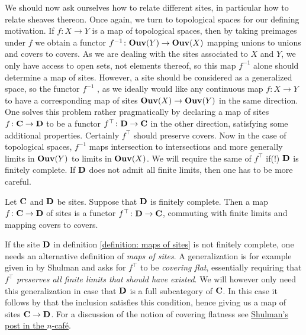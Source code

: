 We should now ask ourselves how to relate different sites, in particular how to relate sheaves thereon. Once again, we turn to topological spaces for our defining motivation. If $f\colon X \to Y$ is a map of topological spaces, then by taking preimages under $f$ we obtain a functor $f^{-1}\colon {{\mathbf{Ouv}}(Y)} \to {{\mathbf{Ouv}}(X)}$ mapping unions to unions and covers to covers. As we are dealing with the sites associated to $X$ and $Y$, we only have access to open sets, not elements thereof, so this map $f^{-1}$ alone should determine a map of sites. However, a site should be considered as a generalized space, so the functor $f^{-1}$ , as we ideally would like any continuous map $f\colon X\to Y$ to have a corresponding map of sites ${{\mathbf{Ouv}}(X)}\to {{\mathbf{Ouv}}(Y)}$ in the same direction. One solves this problem rather pragmatically by declaring a map of sites $f\colon {{\mathbf{C}}}\to{{\mathbf{D}}}$ to be a functor $f^\top\colon{{\mathbf{D}}}\to {{\mathbf{C}}}$ in the other direction, satisfying some additional properties. Certainly $f^\top$ should preserve covers. Now in the case of topological spaces, $f^{-1}$ maps intersection to intersections and more generally limits in ${{\mathbf{Ouv}}(Y)}$ to limits in ${{\mathbf{Ouv}}(X)}$. We will require the same of $f^\top$ if(!) ${{\mathbf{D}}}$ is finitely complete. If ${{\mathbf{D}}}$ does not admit all finite limits, then one has to be more careful.
\begin{definition}
	\label{definition: maps of sites}
	
	Let ${{\mathbf{C}}}$ and ${{\mathbf{D}}}$ be sites. Suppose that ${{\mathbf{D}}}$ is finitely complete. Then a map $f\colon {{\mathbf{C}}} \to {{\mathbf{D}}}$ of sites is a functor $f^\top\colon {{\mathbf{D}}} \to {{\mathbf{C}}}$, commuting with finite limits and mapping covers to covers.
\end{definition}

\begin{remark}
	\label{remark: maps of sites in full generality}
	
	If the site ${{\mathbf{D}}}$ in definition \ref{definition: maps of sites} is not finitely complete, one needs an alternative definition of \emph{maps of sites}. A generalization is for example given in \cite[Def. 4.10]{shulman2012exactcompletionssmallsheaves} by Shulman and asks for $f^\top$ to be \emph{covering flat}, essentially requiring that $f^\top$ \emph{preserves all finite limits that should have existed}. We will however only need this generalization in case that ${{\mathbf{D}}}$ is a full subcategory of ${{\mathbf{C}}}$. In this case it follows by \cite[Def 11.1 \& Thm. 11.2 (b)]{shulman2012exactcompletionssmallsheaves} that the inclusion satisfies this condition, hence giving us a map of sites ${{\mathbf{C}}} \to {{\mathbf{D}}}$. For a discussion of the notion of covering flatness see  \href{https://golem.ph.utexas.edu/category/2011/06/flat_functors_and_morphisms_of.html}{Shulman's post in the $n$-café}.
\end{remark}

